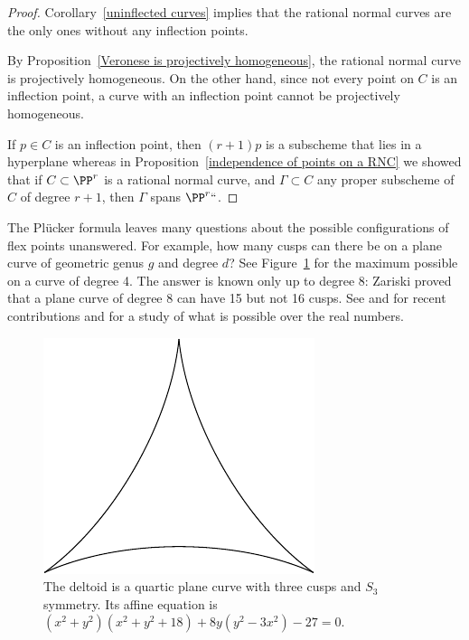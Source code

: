 \begin{proof}
Corollary~\ref{uninflected curves} implies that the
rational normal curves are the only ones without any inflection points.

By Proposition~\ref{Veronese is projectively homogeneous}, the rational
normal curve
is projectively homogeneous. On the other hand, since not every point
on $C$ is an inflection point, a curve with an inflection point cannot
be projectively homogeneous.

If $p \in C$ is an inflection point, then $(r+1)p$ is  a subscheme that
lies in a hyperplane
whereas in Proposition~\ref{independence of points on a RNC} we showed
that if $C \subset \PP^r$ is a rational normal curve, and $\Gamma
\subset C$ any proper subscheme of $C$ of degree $r+1$, then $\Gamma$
spans $\PP^r` `$.
\end{proof}

The Pl\"ucker formula leaves many questions about the possible
configurations of flex points unanswered.
For example, how many cusps can there be on a plane curve of geometric
genus $g$ and degree $d$? See
Figure~\ref{3 real cusps} for the maximum possible on a curve of degree 4.
The answer is known only up to degree 8:
Zariski
%
%
%
%
%
%
\citeyear{Zariski1931}
proved
that
a plane curve of degree 8 can have 15 but not 16 cusps.
See \cite{Calabri} and \cite{Kulikov} for recent contributions and
\cite{Kharlamov-Sottile} for a study of what is possible
over the real numbers.

\begin{figure}\label{3-cusp quartic}
\includegraphics[scale=.7]{"main/deltoid"}
\caption{The deltoid is a quartic plane curve with three cusps and
  $S_3$ symmetry. Its
affine equation is $(x^2+y^2)(x^2+y^2+18)+8y(y^2-3x^2)-27=0$.
}
 \label{3 real cusps}
\end{figure}


